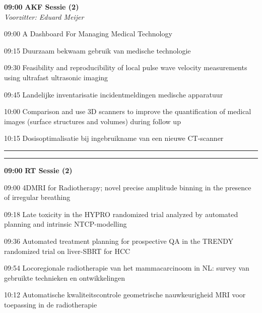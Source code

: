 \documentclass[a4paper,10pt]{report}
\begin{document}
\begin{multicols*}{3}
\begin{packed_enum}
\item[\textbf{09:00}] \textbf{AKF Sessie (2)}\\\textit{Voorzitter: Eduard Meijer}
\item[09:00] A Dashboard For Managing Medical Technology
\item[09:15] Duurzaam bekwaam gebruik van medische technologie
\item[09:30] Feasibility and reproducibility of local pulse wave velocity measurements using ultrafast ultrasonic imaging
\item[09:45] Landelijke inventarisatie incidentmeldingen medische apparatuur 
\item[10:00] Comparison and use 3D scanners to improve the quantification of medical images (surface structures and volumes) during follow up 
\item[10:15] Dosisoptimalisatie bij ingebruikname van een nieuwe CT-scanner 
\end{packed_enum} %

\vfill

\columnbreak

\hrule\vspace{2mm}
\vspace{2mm}\hrule\strut


\begin{packed_enum}
\item[\textbf{09:00}]{\textbf{RT Sessie (2)}}
\item[09:00] 4DMRI for Radiotherapy;  novel precise amplitude binning in the presence of irregular breathing\\
\item[09:18] Late toxicity in the HYPRO randomized trial analyzed by automated planning and intrinsic NTCP-modelling
\item[09:36] Automated treatment planning for prospective QA in the TRENDY randomized trial on liver-SBRT for HCC
\item[09:54] Locoregionale radiotherapie van het mammacarcinoom in NL: survey van gebruikte technieken en ontwikkelingen
\item[10:12] Automatische kwaliteitscontrole geometrische nauw\-keur\-igheid MRI voor toepassing in de radiotherapie
\end{packed_enum} %



\end{multicols*}
\end{document}
